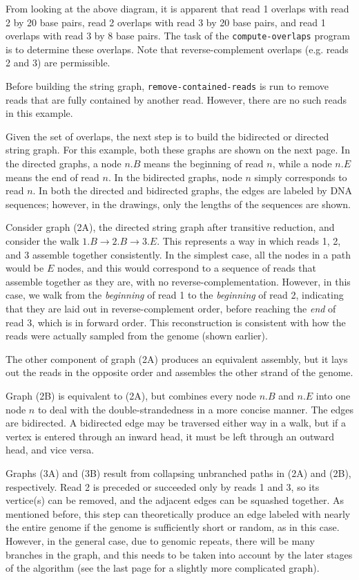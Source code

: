 \documentclass[letterpaper,12pt]{article}
\begin{document}
From looking at the above diagram, it is apparent that read 1 overlaps with read
2 by 20 base pairs, read 2 overlaps with read 3 by 20 base pairs, and read 1
overlaps with read 3 by 8 base pairs.  The task of the {\tt compute-overlaps}
program is to determine these overlaps.  Note that reverse-complement overlaps
(e.g. reads 2 and 3) are permissible.

Before building the string graph, {\tt remove-contained-reads} is run to remove
reads that are fully contained by another read.  However, there are no such
reads in this example.

Given the set of overlaps, the next step is to build the bidirected or directed
string graph.  For this example, both these graphs are shown on the next page.
In the directed graphs, a node $n.B$ means the beginning of read $n$, while a
node $n.E$ means the end of read $n$.  In the bidirected graphs, node $n$ simply
corresponds to read $n$.  In both the directed and bidirected graphs, the edges
are labeled by DNA sequences; however, in the drawings, only the lengths of the
sequences are shown.

Consider graph (2A), the directed string graph after transitive reduction, and
consider the walk $1.B \to 2.B \to 3.E$.  This represents a way in which reads
1, 2, and 3 assemble together consistently.  In the simplest case, all the nodes
in a path would be $E$ nodes, and this would correspond to a sequence of reads
that assemble together as they are, with no reverse-complementation.  However,
in this case, we walk from the {\em beginning} of read 1 to the {\em beginning}
of read 2, indicating that they are laid out in reverse-complement order, before
reaching the {\em end} of read 3, which is in forward order.  This
reconstruction is consistent with how the reads were actually sampled from the
genome (shown earlier).

The other component of graph (2A) produces an equivalent assembly, but it lays
out the reads in the opposite order and assembles the other strand of the
genome.

Graph (2B) is equivalent to (2A), but combines every node $n.B$ and $n.E$ into
one node $n$ to deal with the double-strandedness in a more concise manner.  The
edges are bidirected.  A bidirected edge may be traversed either way in a walk,
but if a vertex is entered through an inward head, it must be left through an
outward head, and vice versa.

Graphs (3A) and (3B) result from collapsing unbranched paths in (2A) and (2B),
respectively.  Read 2 is preceded or succeeded only by reads 1 and 3, so its
vertice(s) can be removed, and the adjacent edges can be squashed together.  As
mentioned before, this step can theoretically produce an edge labeled with
nearly the entire genome if the genome is sufficiently short or random, as in
this case.  However, in the general case, due to genomic repeats, there will be
many branches in the graph, and this needs to be taken into account by the later
stages of the algorithm (see the last page for a slightly more complicated
graph).
\end{document}
